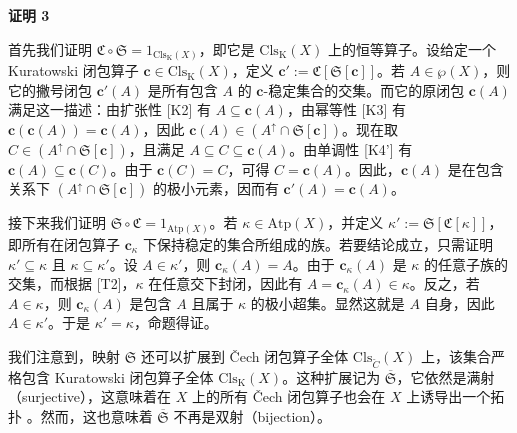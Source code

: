 \textbf{证明 3}

首先我们证明 ${\mathfrak{C}} \circ {\mathfrak{S}} = {\mathfrak{1}}_{\mathrm{Cls}_{\text{K}}(X)}$，即它是 $\mathrm{Cls}_{\text{K}}(X)$ 上的恒等算子。设给定一个 Kuratowski 闭包算子 $\mathbf{c} \in \mathrm{Cls}_{\text{K}}(X)$，定义 $\mathbf{c}' := {\mathfrak{C}}[{\mathfrak{S}}[\mathbf{c}]]$。若 $A \in \wp(X)$，则它的撇号闭包 $\mathbf{c}'(A)$ 是所有包含 $A$ 的 $\mathbf{c}$-稳定集合的交集。而它的原闭包 $\mathbf{c}(A)$ 满足这一描述：由扩张性 [K2] 有 $A \subseteq \mathbf{c}(A)$，由幂等性 [K3] 有 $\mathbf{c}(\mathbf{c}(A)) = \mathbf{c}(A)$，因此 $\mathbf{c}(A) \in (A^{\uparrow} \cap {\mathfrak{S}}[\mathbf{c}])$。现在取 $C \in (A^{\uparrow} \cap {\mathfrak{S}}[\mathbf{c}])$，且满足 $A \subseteq C \subseteq \mathbf{c}(A)$。由单调性 [K4'] 有 $\mathbf{c}(A) \subseteq \mathbf{c}(C)$。由于 $\mathbf{c}(C) = C$，可得 $C = \mathbf{c}(A)$。因此，$\mathbf{c}(A)$ 是在包含关系下 $(A^{\uparrow} \cap {\mathfrak{S}}[\mathbf{c}])$ 的极小元素，因而有 $\mathbf{c}'(A) = \mathbf{c}(A)$。

接下来我们证明 ${\mathfrak{S}} \circ {\mathfrak{C}} = {\mathfrak{1}}_{\mathrm{Atp}(X)}$。若 $\kappa \in \mathrm{Atp}(X)$，并定义 $\kappa' := {\mathfrak{S}}[{\mathfrak{C}}[\kappa]]$，即所有在闭包算子 $\mathbf{c}_{\kappa}$ 下保持稳定的集合所组成的族。若要结论成立，只需证明 $\kappa' \subseteq \kappa$ 且 $\kappa \subseteq \kappa'$。设 $A \in \kappa'$，则 $\mathbf{c}_{\kappa}(A) = A$。由于 $\mathbf{c}_{\kappa}(A)$ 是 $\kappa$ 的任意子族的交集，而根据 [T2]，$\kappa$ 在任意交下封闭，因此有 $A = \mathbf{c}_{\kappa}(A) \in \kappa$。反之，若 $A \in \kappa$，则 $\mathbf{c}_{\kappa}(A)$ 是包含 $A$ 且属于 $\kappa$ 的极小超集。显然这就是 $A$ 自身，因此 $A \in \kappa'$。于是 $\kappa' = \kappa$，命题得证。

我们注意到，映射 ${\mathfrak{S}}$ 还可以扩展到 Čech 闭包算子全体 $\mathrm{Cls}_{\check{C}}(X)$ 上，该集合严格包含 Kuratowski 闭包算子全体 $\mathrm{Cls}_{\text{K}}(X)$。这种扩展记为 ${\overline{\mathfrak{S}}}$，它依然是满射（surjective），这意味着在 $X$ 上的所有 Čech 闭包算子也会在 $X$ 上诱导出一个拓扑 。然而，这也意味着 ${\overline{\mathfrak{S}}}$ 不再是双射（bijection）。

